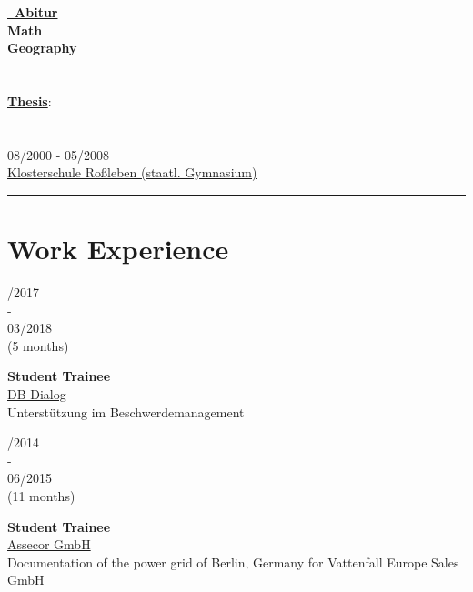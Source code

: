 \documentclass{article}
\begin{document}
\begin{minipage}[t]{0.69\textwidth}
		\hfill
		\begin{minipage}{0.27\textwidth}
	\textbf{\href{https://www.dropbox.com/s/nsgmvy7o64xb9si/Abiturzeugnis.pdf?dl=0}{\color{pblue}\faGraduationCap~Abitur}}\\
	\textbf{Math}\\
	\textbf{Geography}\\\\\\
	\textbf{\underline{Thesis}}:\\
	 \\\\
	 08/2000 - 05/2008\\
	 \href{https://www.klosterschule.de/}{\color{pblue}Klosterschule Roßleben (staatl. Gymnasium)}
\\
		\end{minipage}
		\hrule
		\section*{\fontsize{18pt}{24pt}\selectfont \color{pblue} Work Experience}
		\begin{minipage}{0.49\textwidth}
		\begin{minipage}[t]{0.25\textwidth}
		/2017\\ -\\ 03/2018\\(5 months)
		\end{minipage}
		\hfill
		\begin{minipage}[t]{0.75\textwidth}
		\textbf{Student Trainee}\\ \href{https://assecor.de/}{\color{pblue}DB Dialog}\\
	    Unterstützung im Beschwerdemanagement
		\end{minipage}
		
		\vspace{0.5cm}
		
		\begin{minipage}[t]{0.25\textwidth}
		/2014\\ -\\ 06/2015\\(11 months)
		\end{minipage}
		\hfill
		\begin{minipage}[t]{0.75\textwidth}
		\textbf{Student Trainee}\\
		\href{https://assecor.de/}{\color{pblue}Assecor GmbH}\\
	     Documentation of the power grid of Berlin, Germany for Vattenfall Europe Sales GmbH
		\end{minipage}
		

\end{minipage}
\end{minipage}
\end{document}
